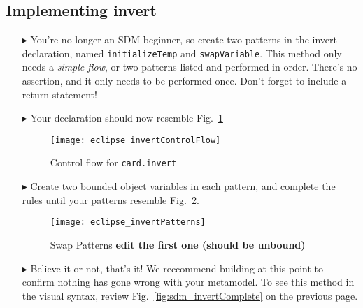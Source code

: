 \newpage
\subsection{Implementing invert}
\texHeader
\hypertarget{invertCard tex}{}

\begin{itemize}

\item[$\blacktriangleright$] You're no longer an SDM beginner, so create two patterns in the invert declaration, named \texttt{initializeTemp} and
\texttt{swapVariable}. This method only needs a \emph{simple flow}, or two patterns listed and performed in order. There's no assertion, and it only needs to be
performed once. Don't forget to include a return statement!

\item[$\blacktriangleright$] Your declaration should now resemble Fig.~\ref{fig:eclipse_invert}

\begin{figure}[htbp]
\begin{center}
  \texttt{[image: eclipse\_invertControlFlow]}
  \caption{Control flow for \texttt{card.invert}}  
  \label{fig:eclipse_invert}
\end{center}
\end{figure}

\item[$\blacktriangleright$] Create two bounded object variables in each pattern, and complete the rules until your patterns resemble
Fig.~\ref{fig:invertPatterns}.

\begin{figure}[htbp]
\begin{center}
  \texttt{[image: eclipse\_invertPatterns]}
  \caption{Swap Patterns {\bf edit the first one (should be unbound)}}  
  \label{fig:invertPatterns}
\end{center}
\end{figure}

\item[$\blacktriangleright$] Believe it or not, that's it! We reccommend building at this point to confirm nothing has gone wrong with your metamodel. To
see this method in the visual syntax, review Fig.~\ref{fig:sdm_invertComplete} on the previous page.

\end{itemize}
